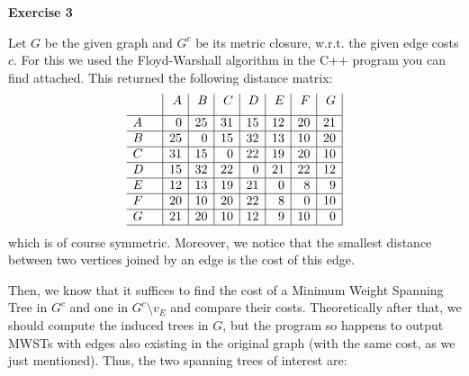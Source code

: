 \documentclass[12pt]{article}
\newenvironment{a_enum}{\begin{enumerate}[label=(\alph{*})]}{\end{enumerate}} %
\begin{document}
{\bf Exercise 3} \begin{a_enum}
\item Let $G$ be the given graph and $G^{c}$ be its metric closure, w.r.t. the given edge costs $c$. For this we used the Floyd-Warshall algorithm in the C++ program you can find attached. This returned the following distance matrix:
$$\begin{array}{ll|r|r|r|r|r|r|r|}
&&A&B&C&D&E&F&G\\[0.5em]\hline
A&&0&25&31&15&12&20&21\\\hline
B&&25&0&15&32&13&10&20\\\hline
C&&31&15&0&22&19&20&10\\\hline
D&&15&32&22&0&21&22&12\\\hline
E&&12&13&19&21&0&8&9\\\hline
F&&20&10&20&22&8&0&10\\\hline
G&&21&20&10&12&9&10&0\\\hline
\end{array}$$
which is of course symmetric. Moreover, we notice that the smallest distance between two vertices joined by an edge is the cost of this edge.

Then, we know that it suffices to find the cost of a Minimum Weight Spanning Tree in $G^c$ and one in $G^c\setminus v_E$ and compare their costs. Theoretically after that, we should compute the induced trees in $G$, but the program so happens to output MWSTs with edges also existing in the original graph (with the same cost, as we just mentioned). Thus, the two spanning trees of interest are:
\begin{center}
\end{center}
\end{a_enum}
\end{document}
